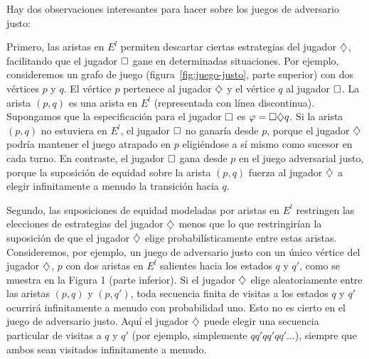 Hay dos observaciones interesantes para hacer sobre los juegos de adversario
justo:

Primero, las aristas en $E^l$ permiten descartar ciertas estrategias del
jugador $\diamondsuit$, facilitando que el jugador $\square$ gane en determinadas
situaciones. Por ejemplo, consideremos un grafo de juego
(figura~\ref{fig:juego-justo}, parte superior) con dos vértices $p$ y $q$. El
vértice $p$ pertenece al jugador $\diamondsuit$ y el vértice $q$ al jugador $\square$.
La arista $(p, q)$ es una arista en $E^l$ (representada con línea discontinua).
Supongamos que la especificación para el jugador $\square$ es $\varphi =
	\square \diamondsuit q$. Si la arista $(p, q)$ no estuviera en $E^l$, el jugador $\square$
no ganaría desde $p$, porque el jugador $\diamondsuit$ podría mantener el juego
atrapado en $p$ eligiéndose a sí mismo como sucesor en cada turno. En
contraste, el jugador $\square$ gana desde $p$ en el juego adversarial justo,
porque la suposición de equidad sobre la arista $(p, q)$ fuerza al jugador
$\diamondsuit$ a elegir infinitamente a menudo la transición hacia $q$.

Segundo, las suposiciones de equidad modeladas por aristas en $E^l$ restringen
las elecciones de estrategias del jugador $\diamondsuit$ menos que lo que
restringirían la suposición de que el jugador $\diamondsuit$ elige probabilísticamente
entre estas aristas. Consideremos, por ejemplo, un juego de adversario justo
con un único vértice del jugador $\diamondsuit$, $p$ con dos aristas en $E^l$
salientes hacia los estados $q$ y $q'$, como se muestra en la Figura 1 (parte
inferior). Si el jugador $\diamondsuit$ elige aleatoriamente entre las aristas $(p,
	q)$ y $(p, q')$, toda secuencia finita de visitas a los estados $q$ y $q'$
ocurrirá infinitamente a menudo con probabilidad uno. Esto no es cierto en el
juego de adversario justo. Aquí el jugador $\diamondsuit$ puede elegir una secuencia
particular de visitas a $q$ y $q'$ (por ejemplo, simplemente $qq'qq'qq'\dots$),
siempre que ambos sean visitados infinitamente a menudo.

